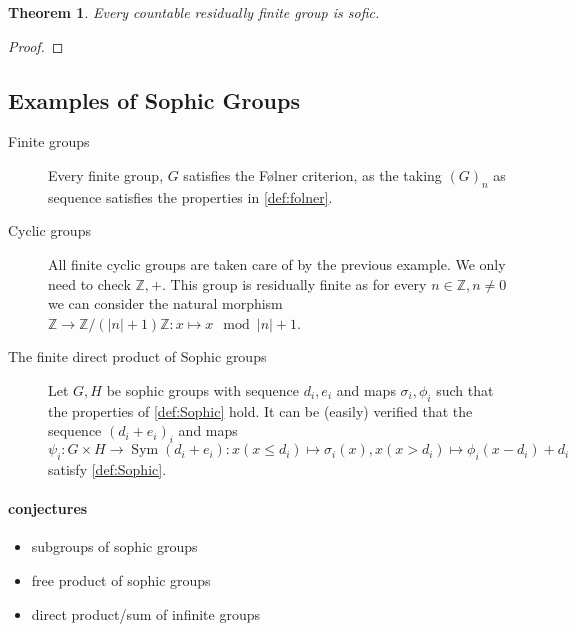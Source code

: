 \documentclass[a4paper]{report}
\newcommand{\Z}{\mathbb{Z}}
\DeclareMathOperator{\sym}{Sym}
\newtheorem{theorem}{Theorem}
\begin{document}
    \begin{theorem}
        Every countable residually finite group is sofic.
    \end{theorem}
    \begin{proof}
        
    \end{proof}

    \subsection{Examples of Sophic Groups}
    \begin{description}
        \item[Finite groups] Every finite group, $G$ satisfies the Følner criterion, as the taking $(G)_n$ as sequence satisfies the properties in \cref{def:folner}.
        \item[Cyclic groups] All finite cyclic groups are taken care of by the previous example. We only need to check $\Z,+$. This group is residually finite as for every $n \in \Z, n \ne 0$ we can consider the natural morphism $\Z \to \Z /(|n|+1)\Z: x \mapsto x \mod |n|+1$. 
        \item[The finite direct product of Sophic groups] Let $G, H$ be sophic groups with sequence $d_i, e_i$ and maps $\sigma_i, \phi_i$ such that the properties of \cref{def:Sophic} hold. It can be (easily) verified that the sequence $(d_i + e_i)_i$ and maps $\psi_i: G \times H \to \sym(d_i + e_i): x (x \le d_i) \mapsto \sigma_i(x), x (x > d_i) \mapsto \phi_i(x -d_i) + d_i$ satisfy \cref{def:Sophic}.  
    \end{description}
    \paragraph{conjectures}
    \begin{itemize}
        \item subgroups of sophic groups
        \item free product of sophic groups
        \item direct product/sum of infinite groups
    \end{itemize}

    
    \printbibliography
\end{document}
